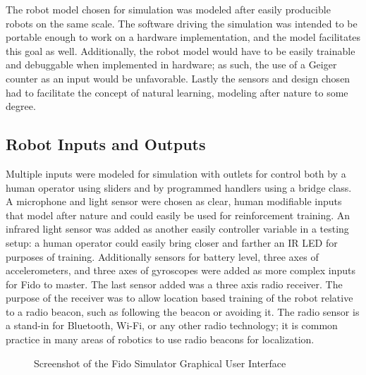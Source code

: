 The robot model chosen for simulation was modeled after easily producible robots on the same scale.  The software driving the simulation was intended to be portable enough to work on a hardware implementation, and the model facilitates this goal as well.  Additionally, the robot model would have to be easily trainable and debuggable when implemented in hardware; as such, the use of a Geiger counter as an input would be unfavorable.  Lastly the sensors and design chosen had to facilitate the concept of natural learning, modeling after nature to some degree.

\subsection{Robot Inputs and Outputs}

Multiple inputs were modeled for simulation with outlets for control both by a human operator using sliders and by programmed handlers using a bridge class.  A microphone and light sensor were chosen as clear, human modifiable inputs that model after nature and could easily be used for reinforcement training.  An infrared light sensor was added as another easily controller variable in a testing setup: a human operator could easily bring closer and farther an IR LED for purposes of training.   Additionally sensors for battery level, three axes of accelerometers, and three axes of gyroscopes were added as more complex inputs for Fido to master.  The last sensor added was a three axis radio receiver.  The purpose of the receiver was to allow location based training of the robot relative to a radio beacon, such as following the beacon or avoiding it.  The radio sensor is a stand-in for Bluetooth, Wi-Fi, or any other radio technology; it is common practice in many areas of robotics to use radio beacons for localization.

\begin{figure}
	\centering
	\caption{Screenshot of the Fido Simulator Graphical User Interface}
\end{figure}

